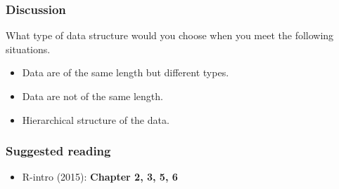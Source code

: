 \documentclass[10pt]{beamer}
\begin{document}
\begin{frame}
\frametitle{Discussion}

  What type of data structure would you choose when you meet the
    following situations.

    \begin{itemize}
    \item Data are of the same length but different types.
    \item Data are not of the same length.
    \item Hierarchical structure of the data.
    \end{itemize}

\end{frame}


\begin{frame}
  \frametitle{Suggested reading}

  \begin{itemize}
  \item R-intro (2015): \textbf{Chapter 2, 3, 5, 6}
  \end{itemize}

\end{frame}
\end{document}
